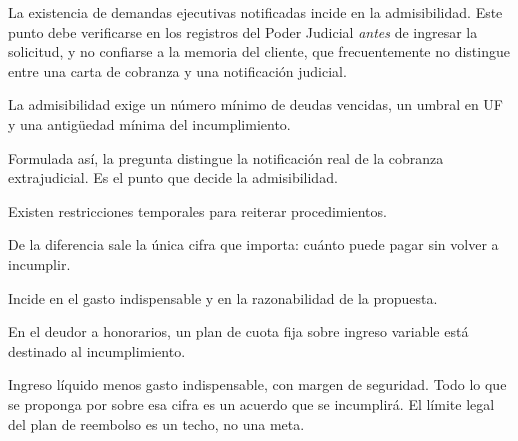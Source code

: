\begin{alerta}
La existencia de demandas ejecutivas notificadas incide en la admisibilidad. Este punto
debe verificarse en los registros del Poder Judicial \emph{antes} de ingresar la
solicitud, y no confiarse a la memoria del cliente, que frecuentemente no distingue entre
una carta de cobranza y una notificación judicial.
\end{alerta}

\bloqueEntrevista

\begin{cuestionario}[Admisibilidad]
  {La admisibilidad exige un número mínimo de deudas vencidas, un umbral en UF y una
  antigüedad mínima del incumplimiento.}

  {Formulada así, la pregunta distingue la notificación real de la cobranza
  extrajudicial. Es el punto que decide la admisibilidad.}

  {Existen restricciones temporales para reiterar procedimientos.}
\end{cuestionario}

\begin{cuestionario}
  {De la diferencia sale la única cifra que importa: cuánto puede pagar sin volver a
  incumplir.}

  {Incide en el gasto indispensable y en la razonabilidad de la propuesta.}

  {En el deudor a honorarios, un plan de cuota fija sobre ingreso variable está destinado
  al incumplimiento.}
\end{cuestionario}

\begin{foco}
Ingreso líquido menos gasto indispensable, con margen de seguridad. Todo lo que se
proponga por sobre esa cifra es un acuerdo que se incumplirá. El límite legal del plan de
reembolso es un techo, no una meta.
\end{foco}

